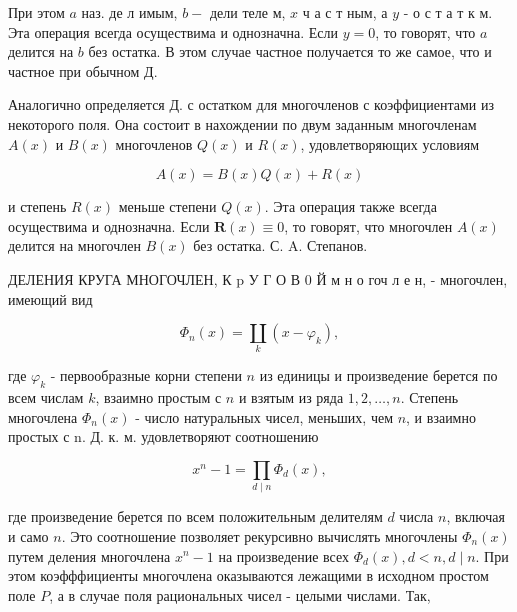 \documentclass[10pt]{article}
\begin{document}
При этом $a$ наз. де л имым, $b-$ дели теле м, $x$ ч а с т ным, а $y$ - о с т а т к м. Эта операция всегда осуществима и однозначна. Если $y=0$, то говорят, что $a$ делится на $b$ без остатка. В этом случае частное получается то же самое, что и частное при обычном Д.



Аналогично определяется Д. с остатком для многочленов с коэффициентами из некоторого поля. Она состоит в нахождении по двум заданным многочленам $A(x)$ и $B(x)$ многочленов $Q(x)$ и $R(x)$, удовлетворяющих условиям



\[

A(x)=B(x) Q(x)+R(x)

\]



и степень $R(x)$ меньше степени $Q(x)$. Эта операция также всегда осуществима и однозначна. Если $\boldsymbol{R}(x) \equiv 0$, то говорят, что многочлен $A(x)$ делится на многочлен $B(x)$ без остатка. С. A. Степанов.



ДЕЛЕНИЯ КРУГА МНОГОЧЛЕН, К $\mathrm{p}$ У Г О В 0 Й м н о гоч л е н, - многочлен, имеющий вид



\[

\Phi_{n}(x)=\coprod_{k}\left(x-\varphi_{k}\right),

\]



где $\varphi_{k}$ - первообразные корни степени $n$ из единицы и произведение берется по всем числам $k$, взаимно простым с $n$ и взятым из ряда $1,2, \ldots, n$. Степень многочлена $\Phi_{n}(x)$ - число натуральных чисел, меньших, чем $n$, и взаимно простых с n. Д. к. м. удовлетворяют соотношению



\[

x^{n}-1=\prod_{d \mid n} \Phi_{d}(x),

\]



где произведение берется по всем положительным делителям $d$ числа $n$, включая и само $n$. Это соотношение позволяет рекурсивно вычислять многочлены $\Phi_{n}(x)$ путем деления многочлена $x^{n}-1$ на произведение всех $\Phi_{d}(x), d<n, d \mid n$. При этом коэфффициенты многочлена оказываются лежащими в исходном простом поле $P$, а в случае поля рациональных чисел - целыми числами. Так,
\end{document}
